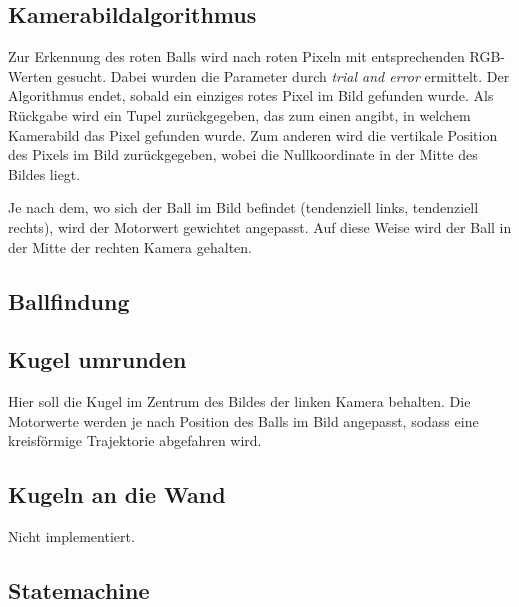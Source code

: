\documentclass{../Vorlage/mat}
\begin{document}
\subsection*{Kamerabildalgorithmus}
Zur Erkennung des roten Balls wird nach roten Pixeln mit entsprechenden RGB-Werten gesucht. Dabei wurden die Parameter durch \textit{trial and error} ermittelt. Der Algorithmus endet, sobald ein einziges rotes Pixel im Bild gefunden wurde. Als Rückgabe wird ein Tupel zurückgegeben, das zum einen angibt, in welchem Kamerabild das Pixel gefunden wurde. Zum anderen wird die vertikale Position des Pixels im Bild zurückgegeben, wobei die Nullkoordinate in der Mitte des Bildes liegt.


Je nach dem, wo sich der Ball im Bild befindet (tendenziell links, tendenziell rechts), wird der Motorwert  gewichtet angepasst. Auf diese Weise wird der Ball in der Mitte der rechten Kamera gehalten.
\subsection*{Ballfindung}


\subsection*{Kugel umrunden}
Hier soll die Kugel im Zentrum des Bildes der linken Kamera behalten. Die Motorwerte werden je nach Position des Balls im Bild angepasst, sodass eine kreisförmige Trajektorie abgefahren wird.


\subsection*{Kugeln an die Wand}
Nicht implementiert.

\subsection*{Statemachine}

\end{document}
